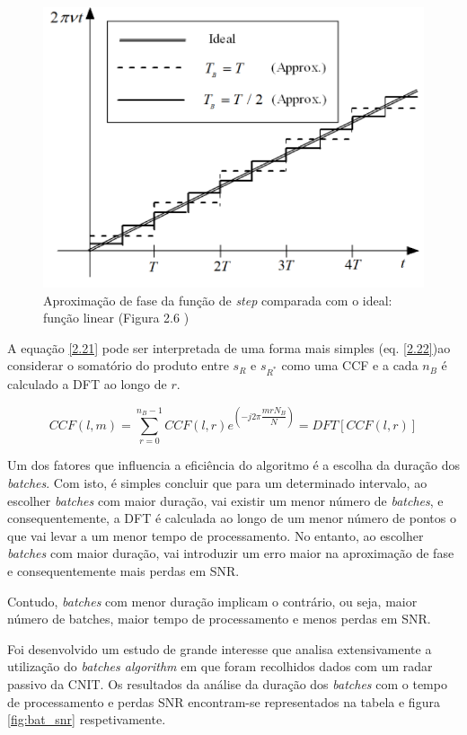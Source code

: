 \begin{figure}[h]
\centering
\includegraphics[scale=0.6]{chapters/ch4/assets/phase_ap}
\caption[Aproximação de fase]{Aproximação de fase da função de \textit{step} comparada com o ideal: função linear (Figura 2.6 \cite{Martorella})}
\label{fig:phase_ap}
\end{figure}

A equação \ref{2.21} pode ser interpretada de uma forma mais simples (eq. \ref{2.22})ao considerar o somatório do produto entre $s_{R}$ e $s_{R^{\ast}}$ como uma \gls{CCF} e a cada $n_{B}$ é calculado a \gls{DFT} ao longo de $r$.

\begin{equation} \label{2.22}
CCF\left( l,m\right)=\sum_{r=0}^{n_{B}-1}CCF\left( l,r\right) e^{\left( -j2\pi \dfrac{mrN_{B}}{N}\right)}=DFT\left[ CCF\left( l,r\right) \right] 
\end{equation}

Um dos fatores que influencia a eficiência do algoritmo é a escolha da duração dos \textit{batches}. Com isto, é simples concluir que para um determinado intervalo, ao escolher \textit{batches} com maior duração, vai existir um menor número de \textit{batches}, e consequentemente, a \gls{DFT} é calculada ao longo de um menor número de pontos o que vai levar a um menor tempo de processamento. No entanto, ao escolher \textit{batches} com maior duração, vai introduzir um erro maior na aproximação de fase e consequentemente mais perdas em \gls{SNR}.\par
Contudo, \textit{batches} com menor duração implicam o contrário, ou seja, maior número de batches, maior tempo de processamento e menos perdas em \gls{SNR}. \par 
Foi desenvolvido um estudo de grande interesse \parencite{Petri2012} que analisa extensivamente a utilização do \textit{batches algorithm} em que foram recolhidos dados com um radar passivo da \gls{CNIT}. Os resultados da análise da duração dos \textit{batches} com o tempo de processamento e perdas \gls{SNR} encontram-se representados na tabela e figura \ref{fig:bat_snr} respetivamente.\par 

